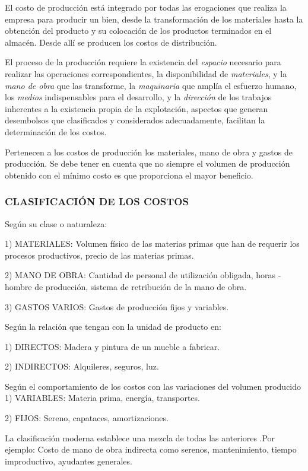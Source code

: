 El costo de producción está integrado por todas las erogaciones que realiza la empresa para producir un bien, desde la transformación de los materiales hasta la obtención del producto y su colocación de los productos terminados en el almacén. Desde allí se producen los costos de distribución.

El proceso de la producción requiere la existencia del \textit{espacio }necesario para realizar las operaciones correspondientes, la disponibilidad de \textit{materiales}, y la \textit{mano de obra }que las transforme, la \textit{maquinaria }que amplía el esfuerzo humano, los \textit{medios }indispensables para el desarrollo, y la \textit{dirección }de los trabajos inherentes a la existencia propia de la explotación, aspectos que generan desembolsos que clasificados y considerados adecuadamente, facilitan la determinación de los costos.

Pertenecen a los costos de producción los materiales, mano de obra y gastos de producción. Se debe tener en cuenta que no siempre el volumen de producción obtenido con el mínimo costo es que proporciona el mayor beneficio.

\subsubsection*{CLASIFICACIÓN DE LOS COSTOS}
Según su clase o naturaleza:

1)  MATERIALES: Volumen físico de las materias primas que han de requerir los procesos productivos, precio de las materias primas.

2)  MANO DE OBRA: Cantidad de personal de utilización obligada, horas - hombre de producción, sistema de retribución de la mano de obra.

3)  GASTOS VARIOS: Gastos de producción fijos y variables.

Según la relación que tengan con la unidad de producto en:

1)  DIRECTOS: Madera y pintura de un mueble a fabricar.

2)  INDIRECTOS: Alquileres, seguros, luz.

Según el comportamiento de los costos con las variaciones del volumen producido 1)  VARIABLES: Materia prima, energía, transportes.

2)  FIJOS: Sereno, capataces, amortizaciones.

La clasificación moderna establece una mezcla de todas las anteriores .Por ejemplo: Costo de mano de obra indirecta como serenos, mantenimiento, tiempo improductivo, ayudantes generales.

